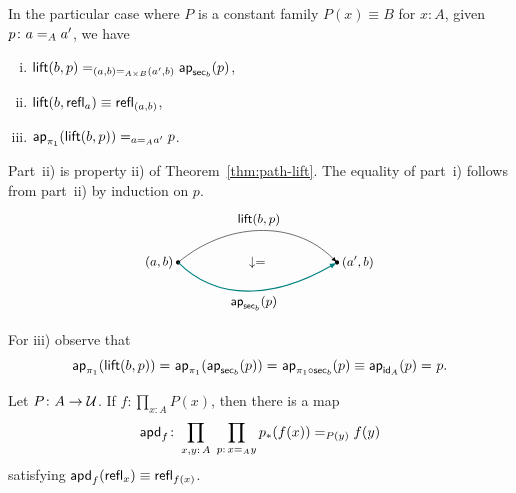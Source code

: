 \begin{rem}\label{rem:sec-lift}
    In the particular case where $P$ is a constant family $P(x)\equiv B$ for $x\colon A$, given $p\colon a\eq Aa'$, we have
    \begin{enumerate}[i)]
        \item $\mathsf{lift}(b,p)\mathrel{=_{(a,b)\mathrel{=_{A\times B}}(a',b)}}\mathsf{ap}_{\mathsf{sec}_b}(p)$,
        \item $\mathsf{lift}(b,\mathsf{refl}_a)\equiv\mathsf{refl}_{(a,b)}$,
        \item $\mathsf{ap}_{\pi_1}(\mathsf{lift}(b,p))\mathrel{=_{a\mathrel{=_{A}}a'}}p$.
    \end{enumerate}
    Part~ii) is property ii) of Theorem~\ref{thm:path-lift}. The equality of part~i) follows from part~ii) by induction on $p$.
    \[
        \begin{tikzpicture}[scale=1,
            >=stealth,
            font=\small]
            \coordinate (start) at (0,0);
            \coordinate (end) at (4,0);
        
            \fill (start) circle (1.5pt) node[left] {$(a,b)$};
            \fill (end) circle (1.5pt) node[right] {$(a',b)$};
        
            \draw[-latex] (start) to[out=40, in=135] 
                node[midway, above,black]
                    {$\fun{lift}(b,p)$} (end);
        
            \draw[-latex,
                thick,
                teal] (start) to[out=-45, in=-150] 
                node[midway, below,black]
                    {$\fun{ap}_{\fun{sec}_b}(p)$} (end);
        
            \node at (2,0) {$\downarrow\eq{}$};
        \end{tikzpicture}
    \]
    For iii) observe that
    \[
        \mathsf{ap}_{\pi_1}(\mathsf{lift}(b,p)) 
        \mathrel{=_{}} \mathsf{ap}_{\pi_1}(\mathsf{ap}_{\mathsf{sec}_b}(p))
        \mathrel{=_{}} \mathsf{ap}_{\pi_1 \circ \mathsf{sec}_b}(p)
        \equiv \mathsf{ap}_{\mathsf{id}_A}(p)
        \mathrel{=_{}} p.
    \]
\end{rem}

\begin{lem}{}\label{lem:dependent-map}
    Let\/ $P\colon A\to\univ$. If\/ $f\colon\prod_{x\colon A}P(x)$, then there is a map
    \[
        \fun{apd}_f\colon\prod_{x,y\colon A}\;
            \prod_{p\colon x\eq Ay}
                p_*(f(x))\eq{P(y)}f(y)
    \]
    satisfying $\mathsf{apd}_f(\mathsf{refl}_x)\equiv\mathsf{refl}_{f(x)}$.
\end{lem}

